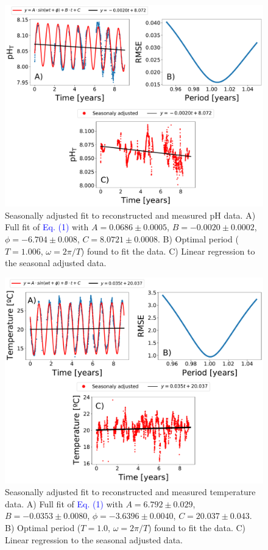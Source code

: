 \begin{figure}[H]
    \centering
    \includegraphics[width=\textwidth]{Figures/Trend_seasonality_pH.pdf}
    \caption{Seasonally adjusted fit to reconstructed and measured pH data.
        A) Full fit of \textcolor{blue}{Eq. (1)} with $A=0.0686 \pm 0.0005$,
        $B=-0.0020
            \pm 0.0002$, $\phi=-6.704 \pm 0.008$,  $C=8.0721 \pm 0.0008$. B)
        Optimal period
        ($T=1.006$, $\omega=2\pi/T$) found to fit the data. C) Linear
        regression to the
        seasonal adjusted data. }
    \label{fig:seasonally_adjusted_fit_pH}
\end{figure}

\begin{figure}[H]
    \centering
    \includegraphics[width=\textwidth]{Figures/Trend_seasonality_T.pdf}
    \caption{Seasonally adjusted fit to reconstructed and measured
        temperature data. A) Full fit of \textcolor{blue}{Eq. (1)} with
        $A=6.792 \pm
            0.029$, $B=-0.0353 \pm 0.0080$, $\phi=-3.6396 \pm 0.0040$,
        $C=20.037 \pm
            0.043$. B) Optimal period ($T=1.0$, $\omega=2\pi/T$) found to fit
        the data. C)
        Linear regression to the seasonal adjusted data.}
    \label{fig:seasonally_adjusted_fit_T}
\end{figure}

